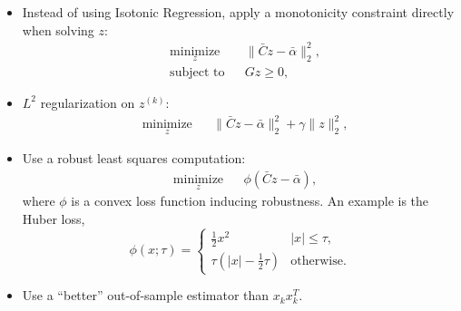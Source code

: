 \documentclass{article}
\begin{document}
\begin{enumerate}
\begin{itemize}
	\item Instead of using Isotonic Regression, apply a monotonicity constraint
	directly when solving $z$:
	\begin{equation*}
	  \begin{aligned}
	    & \underset{z}{\text{minimize}}
	    & & \| \bar{C} z - \bar{\alpha} \|_2^2, \\
	    & \text{subject to}
	    & & Gz \geq 0,
	  \end{aligned}
	\end{equation*}
	
	
	\item $L^2$ regularization on $z^{(k)}$:
	\begin{equation*}
	  \begin{aligned}
	    & \underset{z}{\text{minimize}} 
	    & & \| \bar{C} z - \bar{\alpha} \|_2^2 + \gamma \|z\|_2^2,
	  \end{aligned}
	\end{equation*}

	\item Use a robust least squares computation:
	\begin{equation*}
	  \begin{aligned}
	    & \underset{z}{\text{minimize}} 
	    & & \phi(\bar{C} z - \bar{\alpha}),
	  \end{aligned}
	\end{equation*}
	where $\phi$ is a convex loss function inducing robustness.  An example is the
	Huber loss,
	$$
		\phi(x; \tau) = \begin{cases}
			\frac12 x^2 & |x| \leq \tau,\\
			\tau(|x| - \frac12\tau) & \mbox{otherwise}.
		\end{cases}
	$$
	
	\item Use a ``better'' out-of-sample estimator than $x_k x_k^T$.

\end{itemize}


\end{enumerate}



\end{document}

